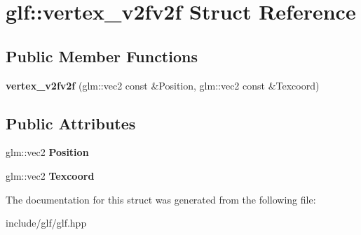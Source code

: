 \hypertarget{structglf_1_1vertex__v2fv2f}{\section{glf\-:\-:vertex\-\_\-v2fv2f Struct Reference}
\label{structglf_1_1vertex__v2fv2f}
}
\subsection*{Public Member Functions}
\begin{DoxyCompactItemize}
\item 
\hypertarget{structglf_1_1vertex__v2fv2f_a77bb2896a9da65e0b94d47fd49e17cda}{{\bfseries vertex\-\_\-v2fv2f} (glm\-::vec2 const \&Position, glm\-::vec2 const \&Texcoord)}\label{structglf_1_1vertex__v2fv2f_a77bb2896a9da65e0b94d47fd49e17cda}

\end{DoxyCompactItemize}
\subsection*{Public Attributes}
\begin{DoxyCompactItemize}
\item 
\hypertarget{structglf_1_1vertex__v2fv2f_ad21f2d992f6b05c51863a59025e32d13}{glm\-::vec2 {\bfseries Position}}\label{structglf_1_1vertex__v2fv2f_ad21f2d992f6b05c51863a59025e32d13}

\item 
\hypertarget{structglf_1_1vertex__v2fv2f_a9c0b9a6cb52b37fd65ffb42ab919a2b7}{glm\-::vec2 {\bfseries Texcoord}}\label{structglf_1_1vertex__v2fv2f_a9c0b9a6cb52b37fd65ffb42ab919a2b7}

\end{DoxyCompactItemize}


The documentation for this struct was generated from the following file\-:\begin{DoxyCompactItemize}
\item 
include/glf/glf.\-hpp\end{DoxyCompactItemize}
